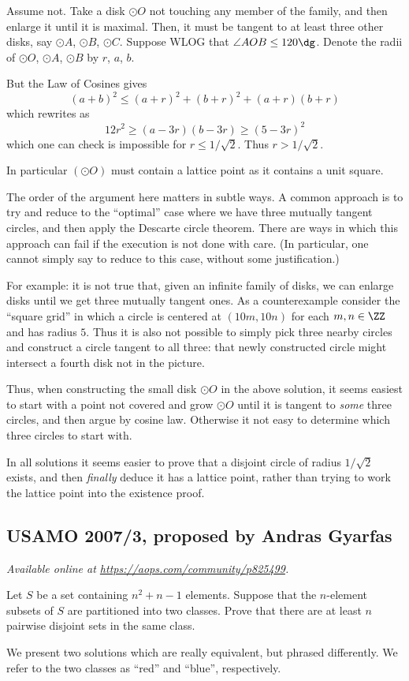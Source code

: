 \documentclass[11pt]{scrartcl}
\begin{document}
Assume not.
Take a disk $\odot O$ not touching any member of the family,
and then enlarge it until it is maximal.
Then, it must be tangent to at least three other disks,
say $\odot A$, $\odot B$, $\odot C$.
Suppose WLOG that $\angle AOB \le 120\dg$.
Denote the radii of $\odot O$, $\odot A$, $\odot B$ by $r$, $a$, $b$.

But the Law of Cosines gives
\[ (a+b)^2 \le (a+r)^2 + (b+r)^2 + (a+r)(b+r) \]
which rewrites as
\[ 12r^2 \ge (a-3r)(b-3r) \ge (5-3r)^2 \]
which one can check is impossible for $r \le 1/\sqrt2$.
Thus $r > 1/\sqrt2$.

In particular $(\odot O)$ must contain a lattice point
as it contains a unit square.

\begin{remark*}
  The order of the argument here matters in subtle ways.
  A common approach is to try and reduce to the ``optimal'' case
  where we have three mutually tangent circles,
  and then apply the Descarte circle theorem.
  There are ways in which this approach can fail
  if the execution is not done with care.
  (In particular, one cannot simply say to reduce
  to this case, without some justification.)

  For example: it is not true that, given an infinite family of disks,
  we can enlarge disks until we get three mutually tangent ones.
  As a counterexample consider the ``square grid''
  in which a circle is centered at $(10m, 10n)$ for each $m,n \in \ZZ$
  and has radius $5$.
  Thus it is also not possible to simply pick three nearby circles
  and construct a circle tangent to all three:
  that newly constructed circle might intersect a fourth disk
  not in the picture.

  Thus, when constructing the small disk $\odot O$
  in the above solution,
  it seems easiest to start with a point not covered and grow $\odot O$
  until it is tangent to \emph{some} three circles,
  and then argue by cosine law.
  Otherwise it not easy to determine which three
  circles to start with.

  In all solutions it seems easier to prove that a disjoint circle
  of radius $1/\sqrt2$ exists,
  and then \emph{finally} deduce it has a lattice point,
  rather than trying to work the lattice point into the existence proof.
\end{remark*}
\pagebreak

\subsection{USAMO 2007/3, proposed by Andras Gyarfas}
\textsl{Available online at \url{https://aops.com/community/p825499}.}
\begin{mdframed}[style=mdpurplebox,frametitle={Problem statement}]
Let $S$ be a set containing $n^2+n-1$ elements.
Suppose that the $n$-element subsets of $S$
are partitioned into two classes.
Prove that there are at least $n$ pairwise disjoint sets
in the same class.
\end{mdframed}
We present two solutions which are really equivalent,
but phrased differently.
We refer to the two classes as ``red'' and ``blue'', respectively.
\end{document}
